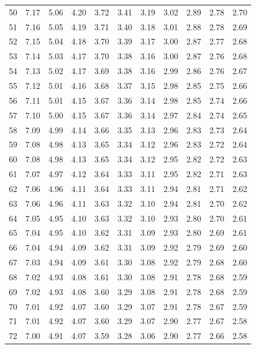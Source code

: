 \documentclass[
]{book}
\theoremstyle{definition}
\theoremstyle{definition}
\theoremstyle{definition}
\theoremstyle{definition}
\theoremstyle{remark}
\begin{document}
\begin{longtable}[]{@{}ccccccccccc@{}}
50 & 7.17 & 5.06 & 4.20 & 3.72 & 3.41 & 3.19 & 3.02 & 2.89 & 2.78 & 2.70 \\
51 & 7.16 & 5.05 & 4.19 & 3.71 & 3.40 & 3.18 & 3.01 & 2.88 & 2.78 & 2.69 \\
52 & 7.15 & 5.04 & 4.18 & 3.70 & 3.39 & 3.17 & 3.00 & 2.87 & 2.77 & 2.68 \\
53 & 7.14 & 5.03 & 4.17 & 3.70 & 3.38 & 3.16 & 3.00 & 2.87 & 2.76 & 2.68 \\
54 & 7.13 & 5.02 & 4.17 & 3.69 & 3.38 & 3.16 & 2.99 & 2.86 & 2.76 & 2.67 \\
55 & 7.12 & 5.01 & 4.16 & 3.68 & 3.37 & 3.15 & 2.98 & 2.85 & 2.75 & 2.66 \\
56 & 7.11 & 5.01 & 4.15 & 3.67 & 3.36 & 3.14 & 2.98 & 2.85 & 2.74 & 2.66 \\
57 & 7.10 & 5.00 & 4.15 & 3.67 & 3.36 & 3.14 & 2.97 & 2.84 & 2.74 & 2.65 \\
58 & 7.09 & 4.99 & 4.14 & 3.66 & 3.35 & 3.13 & 2.96 & 2.83 & 2.73 & 2.64 \\
59 & 7.08 & 4.98 & 4.13 & 3.65 & 3.34 & 3.12 & 2.96 & 2.83 & 2.72 & 2.64 \\
60 & 7.08 & 4.98 & 4.13 & 3.65 & 3.34 & 3.12 & 2.95 & 2.82 & 2.72 & 2.63 \\
61 & 7.07 & 4.97 & 4.12 & 3.64 & 3.33 & 3.11 & 2.95 & 2.82 & 2.71 & 2.63 \\
62 & 7.06 & 4.96 & 4.11 & 3.64 & 3.33 & 3.11 & 2.94 & 2.81 & 2.71 & 2.62 \\
63 & 7.06 & 4.96 & 4.11 & 3.63 & 3.32 & 3.10 & 2.94 & 2.81 & 2.70 & 2.62 \\
64 & 7.05 & 4.95 & 4.10 & 3.63 & 3.32 & 3.10 & 2.93 & 2.80 & 2.70 & 2.61 \\
65 & 7.04 & 4.95 & 4.10 & 3.62 & 3.31 & 3.09 & 2.93 & 2.80 & 2.69 & 2.61 \\
66 & 7.04 & 4.94 & 4.09 & 3.62 & 3.31 & 3.09 & 2.92 & 2.79 & 2.69 & 2.60 \\
67 & 7.03 & 4.94 & 4.09 & 3.61 & 3.30 & 3.08 & 2.92 & 2.79 & 2.68 & 2.60 \\
68 & 7.02 & 4.93 & 4.08 & 3.61 & 3.30 & 3.08 & 2.91 & 2.78 & 2.68 & 2.59 \\
69 & 7.02 & 4.93 & 4.08 & 3.60 & 3.29 & 3.08 & 2.91 & 2.78 & 2.68 & 2.59 \\
70 & 7.01 & 4.92 & 4.07 & 3.60 & 3.29 & 3.07 & 2.91 & 2.78 & 2.67 & 2.59 \\
71 & 7.01 & 4.92 & 4.07 & 3.60 & 3.29 & 3.07 & 2.90 & 2.77 & 2.67 & 2.58 \\
72 & 7.00 & 4.91 & 4.07 & 3.59 & 3.28 & 3.06 & 2.90 & 2.77 & 2.66 & 2.58 \\

\end{longtable}
\end{document}
